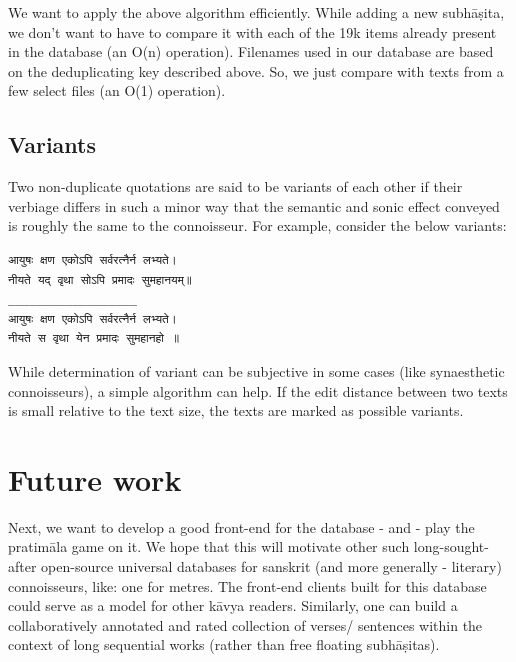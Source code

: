 \documentclass[11pt]{article}
\begin{document}
We want to apply the above algorithm efficiently. While adding a new subhāṣita, we don't want to have to compare it with each of the 19k items already present in the database (an O(n) operation). Filenames used in our database are based on the deduplicating key described above. So, we just compare with texts from a few select files (an O(1) operation).

\subsection{Variants}
Two non-duplicate quotations are said to be variants of each other if their verbiage differs in such a minor way that the semantic and sonic effect conveyed is roughly the same to the connoisseur. For example, consider the below variants:

\begin{verbatim}
आयुषः क्षण एकोऽपि सर्वरत्नैर्न लभ्यते।  
नीयते यद् वृथा सोऽपि प्रमादः सुमहानयम्॥
__________________
आयुषः क्षण एकोऽपि सर्वरत्नैर्न लभ्यते।  
नीयते स वृथा येन प्रमादः सुमहानहो ॥
\end{verbatim}

While determination of variant can be subjective in some cases (like synaesthetic connoisseurs), a simple algorithm can help. If the edit distance between two texts is small relative to the text size, the texts are marked as possible variants.

\section{Future work}
Next, we want to develop a good front-end for the database - and - play the pratimāla game on it. We hope that this will motivate other such long-sought-after open-source universal databases for sanskrit (and more generally - literary) connoisseurs, like: one for metres. The front-end clients built for this database could serve as a model for other kāvya readers. Similarly, one can build a collaboratively annotated and rated collection of verses/ sentences within the context of long sequential works (rather than free floating subhāṣitas).



\end{document}

